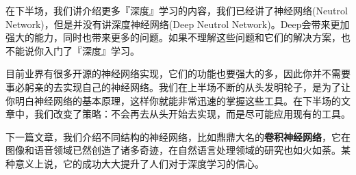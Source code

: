 在下半场，我们讲介绍更多『深度』学习的内容，我们已经讲了神经网络(Neutrol Network)，但是并没有讲深度神经网络(Deep Neutrol Network)。Deep会带来更加强大的能力，同时也带来更多的问题。如果不理解这些问题和它们的解决方案，也不能说你入门了『深度』学习。

目前业界有很多开源的神经网络实现，它们的功能也要强大的多，因此你并不需要事必躬亲的去实现自己的神经网络。我们在上半场不断的从头发明轮子，是为了让你明白神经网络的基本原理，这样你就能非常迅速的掌握这些工具。在下半场的文章中，我们改变了策略：不会再去从头开始去实现，而是尽可能应用现有的工具。

下一篇文章，我们介绍不同结构的神经网络，比如鼎鼎大名的\textbf{卷积神经网络}，它在图像和语音领域已然创造了诸多奇迹，在自然语言处理领域的研究也如火如荼。某种意义上说，它的成功大大提升了人们对于深度学习的信心。


